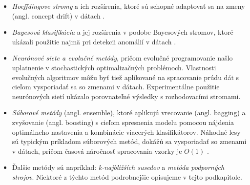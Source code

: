 \begin{itemize}
	\item \textit{Hoeffdingove stromy} a ich rozšírenia, ktoré sú schopné adaptovať sa na zmeny (angl. concept drift) v dátach \citep{hulten2001mining, bifet2009adaptive}.
	\item \textit{Bayesová klasifikácia} a jej rozšírenia v podobe Bayesových stromov, ktoré ukázali použitie najmä pri detekcii anomálií v dátach \citep{hill2007real}.
	\item \textit{Neurónové siete a evolučné metódy}, pričom evolučné programovanie našlo uplatnenie v stochastických optimalizačných problémoch. Vlastnosti evolučných algoritmov môžu byť tiež aplikované na spracovanie prúdu dát s cieľom vysporiadať sa so zmenami v dátach. Experimentálne použitie neurónových sietí ukázalo porovnateľné výsledky s rozhodovacími stromami.
	\item \textit{Súborové metódy} (angl. ensemble), ktoré aplikujú vrecovanie (angl. bagging) a zvyšovanie (angl. boosting) s cieľom spresnenia modelu pomocou nájdenia optimálneho nastavenia a kombinácie viacerých klasifikátorov. Náhodné lesy sú typickým príkladom súborových metód, dokážú sa vysporiadať so zmenami v dátach, pričom časová náročnosť spracovania vzorky je $O(1)$ \citep{abdulsalam2011classification}.
	\item Ďalšie metódy sú napríklad: \textit{k-najbližších susedov} a \textit{metóda podporných strojov}. Niektoré z týchto metód podrobnejšie opisujeme v tejto podkapitole.
\end{itemize}

